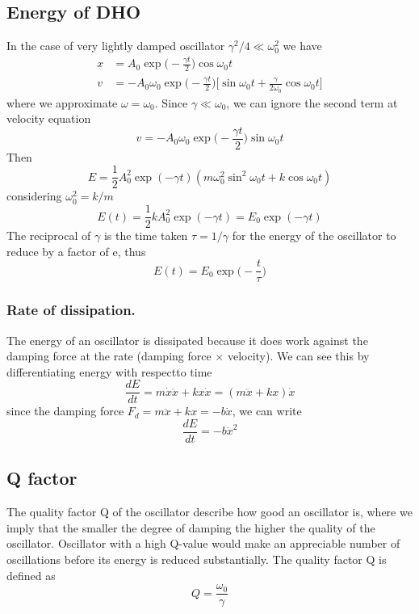 \documentclass[../main.tex]{subfiles}
\begin{document}
\subsection*{Energy of DHO}
In the case of very lightly damped oscillator $\gamma^2/4\ll \omega_0^2$ we have
\begin{align*}
    x &= A_0\exp\biggl(-\frac{\gamma t}{2}\biggr)\cos\omega_0 t\\
    v&=-A_0\omega_0\exp\biggl(-\frac{\gamma t}{2}\biggr)\biggl[\sin\omega_0t +\frac{\gamma}{2\omega_0}\cos\omega_0 t\biggr]
\end{align*}
where we approximate $\omega=\omega_0$. Since $\gamma \ll \omega_0$, we can ignore the second term at velocity equation
\begin{equation*}
    v=-A_0\omega_0\exp\biggl(-\frac{\gamma t}{2}\biggr)\sin\omega_0t 
\end{equation*}
Then
\begin{equation*}
    E=\frac{1}{2}A_0^2 \exp(-\gamma t)(m\omega_0^2\sin^2\omega_0t+k\cos\omega_0t)
\end{equation*}
considering $\omega_0^2=k/m$
\begin{equation*}
   E(t)= \frac{1}{2}kA_0^2\exp(-\gamma t) =E_0\exp(-\gamma t) 
\end{equation*}
The reciprocal of $\gamma$ is the time taken $\tau=1/\gamma$ for the energy of the oscillator to reduce by a factor of e, thus
\begin{equation*}
    E(t)=E_0\exp \biggl(-\frac{t}{\tau}\biggr)
\end{equation*}

\subsubsection*{Rate of dissipation.} The energy of an oscillator is dissipated because it does work against the damping force at the rate (damping force $\times$ velocity). We can see this by differentiating energy with respectto time
\begin{equation*}
    \frac{dE}{dt}=m\dot{x}\ddot{x}+kx\dot{x}=(m\ddot{x}+kx)\dot{x}
\end{equation*}
since the damping force $F_d=m\ddot{x}+kx=-b\dot{x}$, we can write
\begin{equation*}
    \frac{dE}{dt}=-b\dot{x}^2
\end{equation*}

\subsection*{Q factor}
The quality factor Q of the oscillator describe how good an oscillator is, where we imply that the smaller the degree of damping the higher the quality of the oscillator. Oscillator with a high Q-value would make an appreciable number of oscillations before its energy is reduced substantially. The quality factor Q is defined as
\begin{equation*}
    Q=\frac{\omega_0}{\gamma}
\end{equation*}
\end{document}
